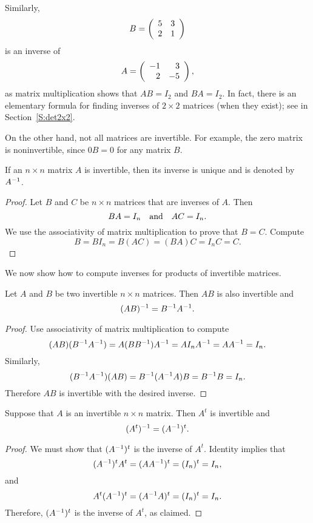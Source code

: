 \documentclass{ximera}
\begin{document}
Similarly,  
\[
B = \left(\begin{array}{rr} 5 & 3\\ 2 &1\end{array}\right)
\]
is an inverse of 
\[
A = \left(\begin{array}{rr} -1 & 3\\ 2 &-5\end{array}\right),
\]
as matrix multiplication shows that $AB=I_2$ and $BA=I_2$. In fact, there is 
an elementary formula for finding inverses of $2\times 2$ matrices (when they 
exist); see  in Section~\ref{S:det2x2}.

On the other hand, not all matrices are invertible.  For example, the zero 
matrix is noninvertible, since $0B=0$ for any matrix $B$.

\begin{lemma} \label{B=C}
If an $n\times n$ matrix $A$ is invertible, then its inverse is unique
and is denoted by $A^{-1}$.
\end{lemma}

\begin{proof}
Let $B$ and $C$ be $n\times n$ matrices that are inverses of $A$.  Then
\[
BA=I_n \quad\mbox{and}\quad AC=I_n.
\]
We use the associativity of matrix multiplication to
prove that $B=C$.  Compute
\[
B = BI_n = B(AC) = (BA)C = I_nC = C.
\]
\end{proof}

We now show how to compute inverses for products of invertible
matrices.

\begin{proposition} \label{P:invprod} 
Let $A$ and $B$ be two invertible $n\times n$ matrices.  Then
$AB$ is also invertible and
\[
(AB)^{-1} = B^{-1} A^{-1}.
\]
\end{proposition}

\begin{proof}  Use associativity of matrix multiplication to compute
\[
(AB)(B^{-1} A^{-1}) = A(BB^{-1})A^{-1} = AI_nA^{-1} = AA^{-1}=I_n.
\]
Similarly,
\[
(B^{-1} A^{-1})(AB) = B^{-1}(A^{-1} A)B = B^{-1} B = I_n.
\]
Therefore $AB$ is invertible with the desired inverse. \end{proof}

\begin{proposition} \label{L:transposeinv} 
Suppose that $A$ is an invertible $n\times n$ matrix.  Then
$A^t$ is invertible and
\[
(A^t)^{-1} = (A^{-1})^t.
\]
\end{proposition}

\begin{proof}  We must show that $(A^{-1})^t$ is the inverse of $A^t$.  Identity
 implies that
\[
(A^{-1})^tA^t = (AA^{-1})^t = (I_n)^t = I_n,
\]
and
\[
A^t(A^{-1})^t = (A^{-1} A)^t = (I_n)^t = I_n.
\]
Therefore, $(A^{-1})^t$ is the inverse of $A^t$, as claimed.  \end{proof}
\end{document}
